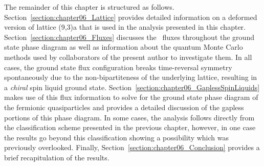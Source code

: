 The remainder of this chapter is structured as follows.
Section~\ref{section:chapter06_Lattice} provides detailed information on a deformed version of lattice (9,3)a that is used in the analysis presented in this chapter.
Section~\ref{section:chapter06_Fluxes} discusses the \ZZ~fluxes throughout the ground state phase diagram as well as information about the quantum Monte Carlo methods used by collaborators of the present author to investigate them.
In all cases, the ground state flux configuration breaks time-reversal symmetry spontaneously due to the non-bipartiteness of the underlying lattice, resulting in a \textit{chiral} spin liquid ground state.
Section~\ref{section:chapter06_GaplessSpinLiquids} makes use of this flux information to solve for the ground state phase diagram of the fermionic quasiparticles and provides a detailed discussion of the gapless portions of this phase diagram.
In some cases, the analysis follows directly from the classification scheme presented in the previous chapter, however, in one case the results go beyond this classification showing a possibility which was previously overlooked.
Finally, Section~\ref{section:chapter06_Conclusion} provides a brief recapitulation of the results.


%
%
